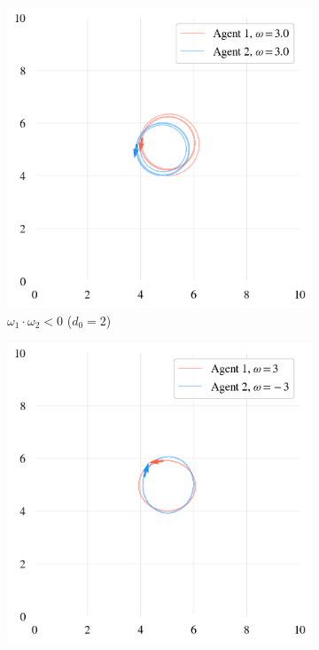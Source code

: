 \documentclass{article}
\begin{document}
\begin{figure}[H]
\begin{subfigure}[b]{0.49\textwidth}
		\includegraphics[width=\textwidth]{./figs/sameChir.png}
		\vspace{-1cm}
		\caption{$\omega_1 \cdot \omega_2 < 0$ ($d_0=2$)}
	\end{subfigure}
	\begin{subfigure}[b]{0.49\textwidth}
		\includegraphics[width=\textwidth]{./figs/diffChirInf.png}

\end{subfigure}
\end{figure}
\end{document}
